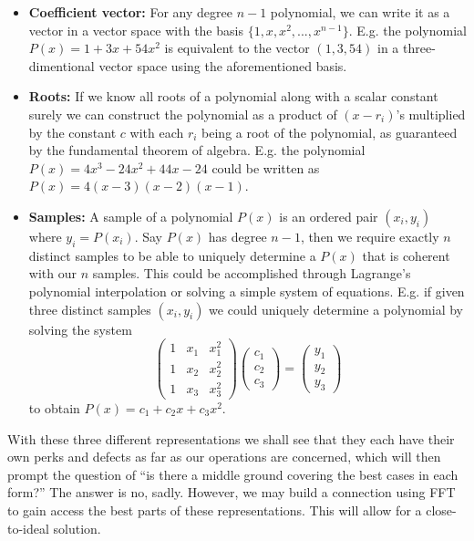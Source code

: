 \documentclass[../article.tex]{subfiles}
\begin{document}
\begin{itemize}
\item{\textbf{Coefficient vector:}} For any degree $n-1$ polynomial, we can write it as a vector in a vector space with the basis $\{1, x, x^2, ..., x^{n-1}\}$. E.g. the polynomial $P(x) = 1+3x+54x^2$ is equivalent to the vector $(1,3,54)$ in a three-dimentional vector space using the aforementioned basis.

\item{\textbf{Roots:}} If we know all roots of a polynomial along with a scalar constant surely we can construct the polynomial as a product of $(x-r_i)$'s multiplied by the constant $c$ with each $r_i$ being a root of the polynomial, as guaranteed by the fundamental theorem of algebra. E.g. the polynomial $P(x) = 4x^3-24x^2+44x-24$ could be written as $P(x) = 4(x-3)(x-2)(x-1)$.

\item{\textbf{Samples:}} A sample of a polynomial $P(x)$ is an ordered pair $(x_i,y_i)$ where $y_i = P(x_i)$. Say $P(x)$ has degree $n-1$, then we require exactly $n$ distinct samples to be able to uniquely determine a $P(x)$ that is coherent with our $n$ samples. This could be accomplished through Lagrange's polynomial interpolation or solving a simple system of equations. E.g. if given three distinct samples $(x_i,y_i)$ we could uniquely determine a polynomial by solving the system
\begin{equation*}
\begin{pmatrix}
1 & x_1 & x_1^2\\
1 & x_2 & x_2^2\\
1 & x_3 & x_3^2
\end{pmatrix}
\begin{pmatrix}
c_1\\
c_2\\
c_3
\end{pmatrix}
=
\begin{pmatrix}
y_1\\
y_2\\
y_3
\end{pmatrix}
\end{equation*}
to obtain $P(x) = c_1+c_2x+c_3x^2$.
\end{itemize}
With these three different representations we shall see that they each have their own perks and defects as far as our operations are concerned, which will then prompt the question of ``is there a middle ground covering the best cases in each form?'' The answer is no, sadly. However, we may build a connection using FFT to gain access the best parts of these representations. This will allow for a close-to-ideal solution.
\end{document}
